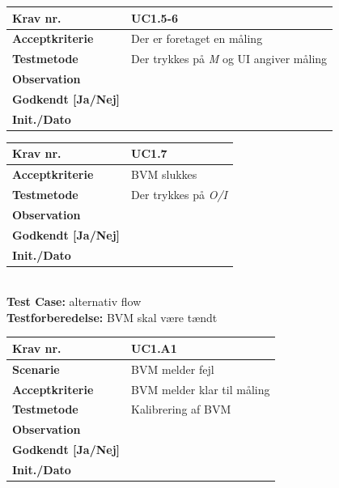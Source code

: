 			

\begin{tabularx}{1\textwidth}{|l|X|}
\hline
\textbf{Krav nr.}              & UC1.5-6  \\ \hline
\textbf{Acceptkriterie}        & Der er foretaget en måling\\ \hline
\textbf{Testmetode}            & Der trykkes på \textit{M} og UI angiver måling\\ \hline
\textbf{Observation}           &  \\ \hline
\textbf{Godkendt {[}Ja/Nej{]}} &  \\ \hline
\textbf{Init./Dato}            &  \\ \hline
\end{tabularx}


\begin{tabularx}{1\textwidth}{|l|X|}
\hline
\textbf{Krav nr.}              & UC1.7  \\ \hline
\textbf{Acceptkriterie}        & BVM slukkes\\ \hline
\textbf{Testmetode}            & Der trykkes på \textit{O/I} \\ \hline
\textbf{Observation}           &  \\ \hline
\textbf{Godkendt {[}Ja/Nej{]}} &  \\ \hline
\textbf{Init./Dato}            &  \\ \hline
\end{tabularx}\\
	
		
\pagebreak
\textbf{Test Case:} alternativ flow\\
\textbf{Testforberedelse:} BVM skal være tændt\\


\begin{tabularx}{1\textwidth}{|l|X|}
\hline
\textbf{Krav nr.}              & UC1.A1  \\ 
\hline
\textbf{Scenarie}              & BVM melder fejl  \\ \hline
\textbf{Acceptkriterie}        & BVM melder klar til måling\\ \hline
\textbf{Testmetode}            & Kalibrering af BVM \\ \hline
\textbf{Observation}           &  \\ \hline
\textbf{Godkendt {[}Ja/Nej{]}} &  \\ \hline
\textbf{Init./Dato}            &  \\ \hline
\end{tabularx}


